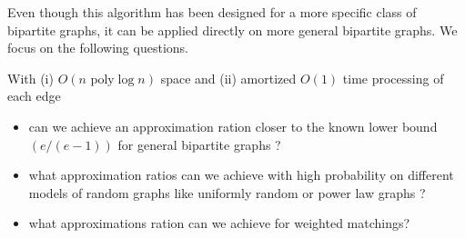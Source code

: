 \documentclass{scrartcl}
\begin{document}
Even though this algorithm has been designed for a more specific class of bipartite graphs, it can be applied directly on more general bipartite graphs. We focus on the following questions.

With (i) $O(n \text{ poly} \log n)$ space and  (ii) amortized $O(1)$ time processing of each edge
\begin{itemize}
\item  can we achieve an approximation ration closer to the known lower bound $(e/(e-1))$ for general bipartite graphs ?
\item what approximation ratios can we achieve with high probability on different models of random graphs like uniformly random or power law graphs ?
\item what approximations ration can we achieve for weighted matchings?

\end{itemize}

%



%
%
\end{document}
